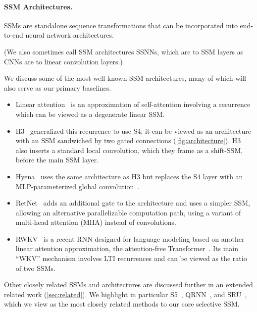\paragraph{SSM Architectures.} SSMs are standalone sequence transformations that can be incorporated into end-to-end neural network architectures.

(We also sometimes call SSM architectures SSNNs, which are to SSM layers as CNNs are to linear convolution layers.)

We discuss some of the most well-known SSM architectures, many of which will also serve as our primary baselines.

\begin{itemize}[leftmargin=*]

  \item Linear attention~\citep{katharopoulos2020transformers} is an approximation of self-attention involving a recurrence which can be viewed as a degenerate linear SSM.
  \item H3~\citep{dao2023hungry} generalized this recurrence to use S4; it can be viewed as an architecture with an SSM sandwiched by two gated connections (\ref{fig:architecture}).
    H3 also inserts a standard local convolution, which they frame as a shift-SSM, before the main SSM layer.
  \item Hyena~\citep{poli2023hyena} uses the same architecture as H3 but replaces the S4 layer with an MLP-parameterized global convolution~\citep{romero2021ckconv}. 

  \item RetNet~\citep{sun2023retentive} adds an additional gate to the architecture and uses a simpler SSM, allowing an alternative parallelizable computation path, using a variant of multi-head attention (MHA) instead of convolutions.
    \item RWKV~\citep{peng2023rwkv} is a recent RNN designed for language modeling based on another linear attention approximation, the attention-free Transformer~\citep{zhai2021attention}. Its main ``WKV'' mechanism involves LTI recurrences and can be viewed as the ratio of two SSMs.

\end{itemize}

Other closely related SSMs and architectures are discussed further in an extended related work (\ref{sec:related}).
We highlight in particular S5~\citep{smith2023s5}, QRNN~\citep{bradbury2016quasi},
and SRU~\citep{lei2017simple},
which we view as the most closely related methods to our core selective SSM.

